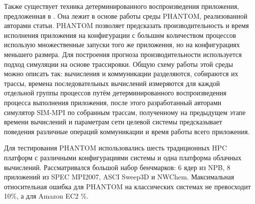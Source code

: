 		Также существует техника детерминированного воспроизведения приложения, предложенная в \cite{representative_replay}. Она лежит в основе работы среды PHANTOM, реализованной авторами статьи. PHANTOM позволяет предсказать производительность и время исполнения приложения на конфигурации с большим количеством процессов использую множественные запуски того же приложения, но на конфигурациях меньшего размера. Для построения прогноза производительности используется подход симуляции на основе трассировки. Общую схему работы этой среды можно описать так: вычисления и коммуникации разделяются, собираются их трассы, времена последовательных вычислений измеряются для каждой отдельной группы процессов путём детерминированного воспроизведения процесса выполнения приложения, после этого разработанный авторами симулятор SIM-MPI по собранным трассам, полученному на предыдущем этапе времени вычислений и параметрам сети целевой системы предсказывает поведения различные операций коммуникации и время работы всего приложения.

		Для тестирования PHANTOM использовались шесть традиционных HPC платформ с различными конфигурациями системы %
		и одна платформа облачных вычислений.%
		Рассматривался большой набор бенчмарков: 6 ядер из NPB, 8 приложений из SPEC MPI2007, ASCI Sweep3D и NWChem. Максимальная относительная ошибка для PHANTOM на классических системах не превосходит 10\%, а для Amazon EC2 \%.

